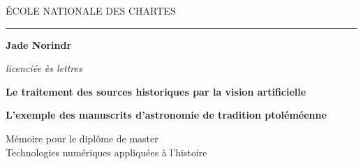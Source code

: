 \begin{titlepage}
    \begin{center}
        
        \bigskip
        
        \begin{large}
            ÉCOLE NATIONALE DES CHARTES
        \end{large}
        \begin{center}\rule{2cm}{0.02cm}\end{center}
        
        \bigskip
        \bigskip
        \bigskip
        \begin{Large}
            \textbf{Jade Norindr}\\
        \end{Large}
        \begin{normalsize} \textit{licenciée ès lettres}\\
        \end{normalsize}
        
        \bigskip
        \bigskip
        \bigskip
        
        \begin{Huge}
            \textbf{Le traitement des sources historiques par la vision artificielle}\\
        \end{Huge}
        \bigskip
        \bigskip
        \begin{LARGE}
            \textbf{L'exemple des manuscrits d'astronomie de tradition ptoléméenne}\\
        \end{LARGE}
        
        \bigskip
        \bigskip
        \bigskip
        \begin{large}
        \end{large}
        \vfill
        
        \begin{large}
            Mémoire 
            pour le diplôme de master \\
            \og Technologies numériques appliquées à l'histoire~\fg\\
        \end{large}
        
    \end{center}
\end{titlepage}